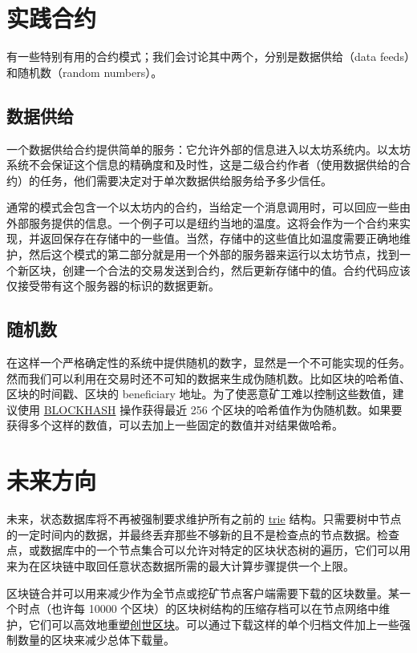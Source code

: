 \documentclass[9pt,oneside]{amsart}
\begin{document}
\begin{multicols}{2}
\section{实践合约}

有一些特别有用的合约模式；我们会讨论其中两个，分别是数据供给（data feeds）和随机数（random numbers）。

\subsection{数据供给}

一个数据供给合约提供简单的服务：它允许外部的信息进入以太坊系统内。以太坊系统不会保证这个信息的精确度和及时性，这是二级合约作者（使用数据供给的合约）的任务，他们需要决定对于单次数据供给服务给予多少信任。

通常的模式会包含一个以太坊内的合约，当给定一个消息调用时，可以回应一些由外部服务提供的信息。一个例子可以是纽约当地的温度。这将会作为一个合约来实现，并返回保存在存储中的一些值。当然，存储中的这些值比如温度需要正确地维护，然后这个模式的第二部分就是用一个外部的服务器来运行以太坊节点，找到一个新区块，创建一个合法的交易发送到合约，然后更新存储中的值。合约代码应该仅接受带有这个服务器的标识的数据更新。

\subsection{随机数}

在这样一个严格确定性的系统中提供随机的数字，显然是一个不可能实现的任务。然而我们可以利用在交易时还不可知的数据来生成伪随机数。比如区块的哈希值、区块的时间戳、区块的 beneficiary 地址。为了使恶意矿工难以控制这些数值，建议使用 {\small \hyperlink{blockhash}{BLOCKHASH}} 操作获得最近 256 个区块的哈希值作为伪随机数。如果要获得多个这样的数值，可以去加上一些固定的数值并对结果做哈希。

\section{未来方向} \label{ch:future}

未来，状态数据库将不再被强制要求维护所有之前的 \hyperlink{trie}{trie} 结构。只需要树中节点的一定时间内的数据，并最终丢弃那些不够新的且不是检查点的节点数据。检查点，或数据库中的一个节点集合可以允许对特定的区块状态树的遍历，它们可以用来为在区块链中取回任意状态数据所需的最大计算步骤提供一个上限。

区块链合并可以用来减少作为全节点或挖矿节点客户端需要下载的区块数量。某一个时点（也许每 10000 个区块）的区块树结构的压缩存档可以在节点网络中维护，它们可以高效地重塑\hyperlink{Genesis_Block}{创世区块}。可以通过下载这样的单个归档文件加上一些强制数量的区块来减少总体下载量。


\end{multicols}
\end{document}
